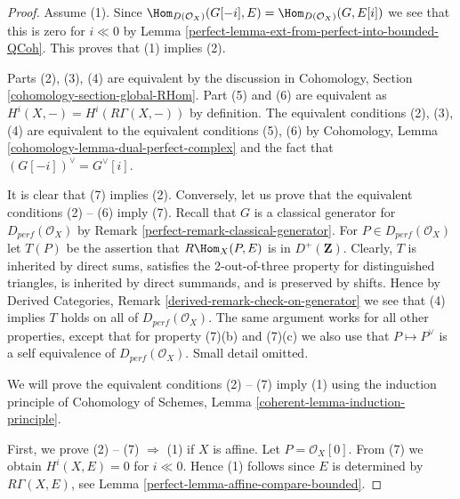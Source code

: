 \begin{proof}

Assume (1). Since
$\Hom_{D(\mathcal{O}_X)}(G[-i], E) = \Hom_{D(\mathcal{O}_X)}(G, E[i])$
we see that this is zero for $i \ll 0$ by
Lemma \ref{perfect-lemma-ext-from-perfect-into-bounded-QCoh}. This proves
that (1) implies (2).

\medskip\noindent
Parts (2), (3), (4) are equivalent by the discussion in
Cohomology, Section \ref{cohomology-section-global-RHom}.
Part (5) and (6) are equivalent as $H^i(X, -) = H^i(R\Gamma(X, -))$
by definition. The equivalent conditions (2), (3), (4) are
equivalent to the equivalent conditions (5), (6) by
Cohomology, Lemma \ref{cohomology-lemma-dual-perfect-complex}
and the fact that $(G[-i])^\vee = G^\vee[i]$.

\medskip\noindent
It is clear that (7) implies (2). Conversely,
let us prove that the equivalent conditions (2) -- (6) imply (7).
Recall that $G$ is a  classical generator for $D_{perf}(\mathcal{O}_X)$ by
Remark \ref{perfect-remark-classical-generator}.
For $P \in D_{perf}(\mathcal{O}_X)$ let $T(P)$ be the assertion that
$R\Hom_X(P, E)$ is in $D^+(\mathbf{Z})$.
Clearly, $T$ is inherited by direct sums,
satisfies the 2-out-of-three property for distinguished
triangles, is inherited by direct summands, and is preserved by shifts.
Hence by Derived Categories, Remark \ref{derived-remark-check-on-generator}
we see that (4) implies $T$ holds on all of $D_{perf}(\mathcal{O}_X)$.
The same argument works for all other properties, except that for property
(7)(b) and (7)(c) we also use that $P \mapsto P^\vee$ is a self
equivalence of $D_{perf}(\mathcal{O}_X)$. Small detail omitted.

\medskip\noindent
We will prove the equivalent conditions (2) -- (7) imply (1)
using the induction principle of
Cohomology of Schemes, Lemma \ref{coherent-lemma-induction-principle}.

\medskip\noindent
First, we prove (2) -- (7) $\Rightarrow$ (1) if $X$ is affine.
Let $P = \mathcal{O}_X[0]$. From (7) we obtain $H^i (X, E) = 0$
for $i \ll 0$. Hence (1) follows since $E$ is
determined by $R\Gamma (X, E)$, see Lemma \ref{perfect-lemma-affine-compare-bounded}.


\end{proof}
